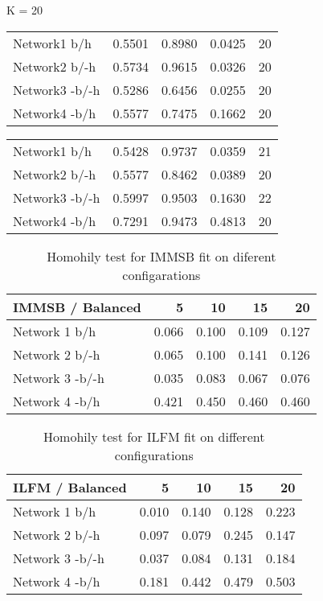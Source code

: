 \begin{table*}[h]

	\begin{minipage}[h]{0.45\linewidth} 
K = 20
\begin{tabular}{lrrrr}

 Network1 b/h           &   0.5501 &      0.8980 &   0.0425 & 20 \\
 Network2 b/-h        &   0.5734 &      0.9615 &   0.0326 & 20 \\
 Network3 -b/-h       &   0.5286 &      0.6456 &   0.0255 & 20 \\
 Network4 -b/h         &   0.5577 &      0.7475 &   0.1662 & 20 \\
\hline
\end{tabular}
\end{minipage}
\hspace{0.8cm}
\begin{minipage}[h]{0.45\linewidth}
\begin{tabular}{lrrrr}
 Network1 b/h         &   0.5428 &      0.9737 &   0.0359 &  21 \\
 Network2 b/-h      &   0.5577 &      0.8462 &   0.0389 &  20 \\
 Network3 -b/-h     &   0.5997 &      0.9503 &   0.1630 &  22 \\
 Network4 -b/h      &   0.7291 &      0.9473 &   0.4813 & 20 \\
\hline
\end{tabular}
\end{minipage}
\end{table*}


\begin{table}
    \caption{Homohily test for IMMSB fit on diferent configarations}
\begin{tabular}{lrrrr}
\hline
IMMSB / Balanced   &     5 &    10 &    15 &    20 \\
\hline
Network 1 b/h          & 0.066 & 0.100 & 0.109 & 0.127 \\
Network 2 b/-h        & 0.065 & 0.100 & 0.141 & 0.126 \\
Network 3 -b/-h       & 0.035 & 0.083 & 0.067 & 0.076 \\
Network 4 -b/h         & 0.421 & 0.450 & 0.460 & 0.460 \\
\hline
\end{tabular}
\end{table}

\begin{table}
    \caption{Homohily test for ILFM fit on different configurations}
\begin{tabular}{lrrrr}
\hline
ILFM / Balanced   &     5 &    10 &    15 &    20 \\
\hline
Network 1 b/h        & 0.010 & 0.140 & 0.128 & 0.223 \\
Network 2 b/-h      & 0.097 & 0.079 & 0.245 & 0.147 \\
Network 3 -b/-h     & 0.037 & 0.084 & 0.131 & 0.184 \\
Network 4 -b/h       & 0.181 & 0.442 & 0.479 & 0.503 \\
\hline
\end{tabular}
\end{table}
